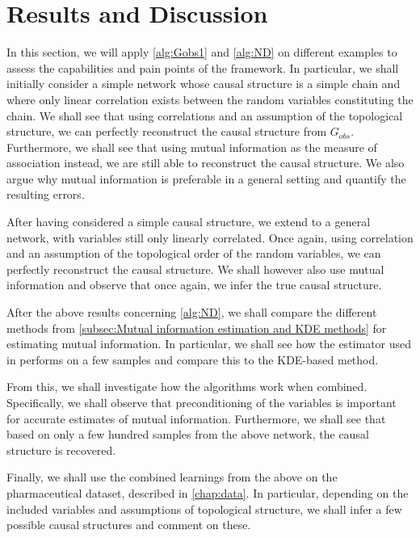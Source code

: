 \documentclass[../Thesis.tex]{subfiles}
\begin{document}
\chapter{Results and Discussion}\label{chap:results}
In this section, we will apply \autoref{alg:Gobs1} and \autoref{alg:ND} on different examples to assess the capabilities and pain points of the framework. In particular, we shall initially consider a simple network whose causal structure is a simple chain and where only linear correlation exists between the random variables constituting the chain. We shall see that using correlations and an assumption of the topological structure, we can perfectly reconstruct the causal structure from $G_{obs}$. Furthermore, we shall see that using mutual information as the measure of association instead, we are still able to reconstruct the causal structure. We also argue why mutual information is preferable in a general setting and quantify the resulting errors.

After having considered a simple causal structure, we extend to a general network, with variables still only linearly correlated. Once again, using correlation and an assumption of the topological order of the random variables, we can perfectly reconstruct the causal structure. We shall however also use mutual information and observe that once again, we infer the true causal structure.

After the above results concerning \autoref{alg:ND}, we shall compare the different methods from \autoref{subsec:Mutual information estimation and KDE methods} for estimating mutual information. In particular, we shall see how the estimator used in \cite{Network-deconvolution-as-a-general-method-to-distinguish-direct-dependencies-in-networks} performs on a few samples and compare this to the KDE-based method.

From this, we shall investigate how the algorithms work when combined. Specifically, we shall observe that preconditioning of the variables is important for accurate estimates of mutual information. Furthermore, we shall see that based on only a few hundred samples from the above network, the causal structure is recovered.

Finally, we shall use the combined learnings from the above on the pharmaceutical dataset, described in \autoref{chap:data}. In particular, depending on the included variables and assumptions of topological structure, we shall infer a few possible causal structures and comment on these.


\newpage
\end{document}
